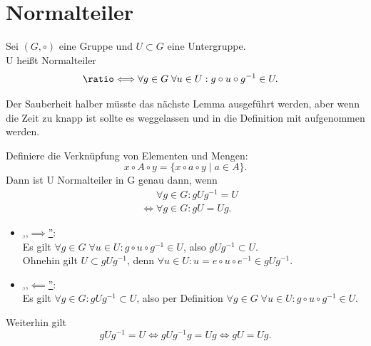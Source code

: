 \documentclass[a4paper]{article}
\newcommand*{\longeq}{\ratio\Longleftrightarrow}
\begin{document}
    \section{Normalteiler}
    \begin{definition}
        Sei $(G, \circ)$ eine Gruppe und $U \subset G$ eine Untergruppe. \\
        U heißt Normalteiler
        \begin{align*}
        &\longeq \forall g \in G \; \forall u \in U: g \circ u \circ g^{-1} \in U
        .\end{align*}    
    \end{definition}
    Der Sauberheit halber müsste das nächste Lemma ausgeführt werden, aber wenn die Zeit zu knapp ist sollte es weggelassen und in die Definition mit aufgenommen werden.
    \begin{lemma}
        Definiere die Verknüpfung von Elementen und Mengen: 
        \[
        x \circ A \circ y = \{x \circ a \circ y  \mid a \in A\}
        .\] 
        Dann ist U Normalteiler in G genau dann, wenn
        \begin{align*}
            &\phantom{\iff} \forall g \in G: g U g^{-1} = U \\
            &\iff \forall g \in G: g U = U g
        .\end{align*}
    \end{lemma}

    \begin{beweis}
        \begin{itemize}
            \item \underline{,,$\implies$''}: \\
                    Es gilt $\forall g \in G \; \forall u \in U: g \circ u \circ g^{-1} \in U$, also $g U g^{-1} \subset U$. \\
                    Ohnehin gilt $U \subset g U g^{-1}$, denn $\forall u \in U: u = e \circ u \circ e ^{-1} \in g U g^{-1}$.
                \item \underline{,,$\impliedby $''}: \\
                    Es gilt $\forall g \in G: g U g ^{-1} \subset U$, also per Definition $\forall g \in G \; \forall u \in U: g \circ u \circ g ^{-1} \in U$.
        \end{itemize}
        Weiterhin gilt
        \[
        g U g^{-1} = U \iff g U g^{-1} g = U g \iff g U = U g
        .\] 
    \end{beweis}
\end{document}
